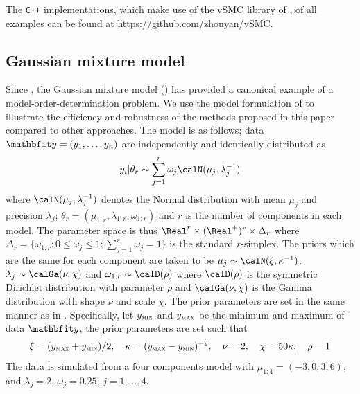 The \texttt{C++} implementations, which make use of the vSMC library of
\cite{software:VSMC}, of all examples can be found at
\url{https://github.com/zhouyan/vSMC}.

\subsection{Gaussian mixture model}
\label{sub:Gaussian mixture model}

Since \cite{Richardson:1997ea}, the Gaussian mixture model (\gmm) has
provided a canonical example of a model-order-determination problem. We use
the model formulation of \cite{DelMoral:2006hc} to illustrate the efficiency
and robustness of the methods proposed in this paper compared to other
approaches. The model is as follows; data $\data = (y_1,\dots,y_n)$ are
independently and identically distributed as
\begin{equation*}
  y_i|\theta_r \sim \sum_{j=1}^r \omega_j\calN(\mu_j,\lambda_j^{-1})
\end{equation*}
where $\calN(\mu_j,\lambda_j^{-1})$ denotes the Normal distribution with
mean $\mu_j$ and precision $\lambda_j$; $\theta_r =
(\mu_{1:r},\lambda_{1:r},\omega_{1:r})$ and $r$ is the number of components
in each model. The parameter space is thus $\Real^r \times (\Real^{+})^r\times
\Delta_r$ where $\Delta_r = \{\omega_{1:r}:0\le\omega_j\le1;
\sum_{j=1}^r\omega_j=1\}$ is the standard $r$-simplex. The priors which are
the same for each component are taken to be
$\mu_j\sim\calN(\xi,\kappa^{-1})$, $\lambda_j\sim\calGa(\nu,\chi)$ and
$\omega_{1:r}\sim\calD(\rho)$ where $\calD(\rho)$ is the symmetric Dirichlet
distribution with parameter $\rho$ and $\calGa(\nu,\chi)$ is the Gamma
distribution with shape $\nu$ and scale $\chi$. The prior parameters are set
in the same manner as in \cite{Richardson:1997ea}. Specifically, let $y_{\textsc{min}}$
and $y_{\textsc{max}}$ be the minimum and maximum of data $\data$, the prior parameters
are set such that
\begin{equation*}
  \xi = (y_{\textsc{max}} + y_{\textsc{min}}) / 2, \quad \kappa = (y_{\textsc{max}} - y_{\textsc{min}})^{-2}, \quad
  \nu = 2, \quad \chi = 50\kappa, \quad \rho = 1
\end{equation*}
The data is simulated from a four components model with $\mu_{1:4} = (-3, 0,3,
6)$, and $\lambda_j =2$, $\omega_j = 0.25$, $j = 1,\dots,4$.

